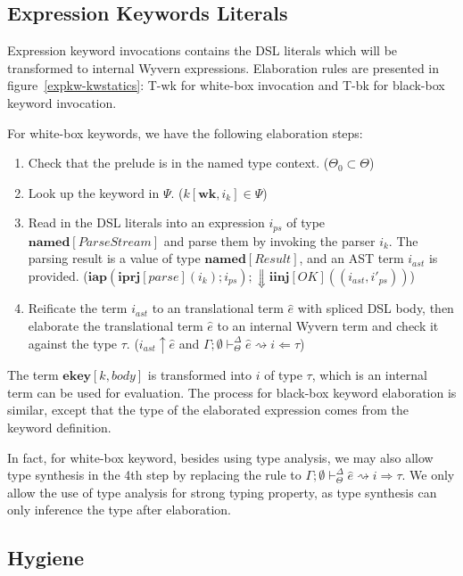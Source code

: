 \documentclass{sig-alternate}
\newcommand{\myvdash}{\vdash_{\Theta}^{\Delta}}
\begin{document}


\subsection{Expression Keywords Literals}
Expression keyword invocations contains the DSL literals which will be transformed to internal Wyvern expressions. Elaboration rules are presented in figure~\ref{expkw-kwstatics}: T-wk for white-box invocation and T-bk for black-box keyword invocation.

For white-box keywords, we have the following elaboration steps:
\begin{enumerate}\setlength{\itemsep}{0pt}
\item Check that the prelude is in the named type context. ($\Theta_0\subset\Theta$)
\item Look up the keyword in $\Psi$. ($k[\mathbf{wk},i_k]\in\Psi$)
\item Read in the DSL literals into an expression $i_{ps}$ of type $\mathbf{named}[ParseStream]$ and parse them by invoking the parser $i_k$. The parsing result is a value of type $\mathbf{named}[Result]$, and an AST term $i_{ast}$ is provided. ($\mathbf{iap}(\mathbf{iprj}[parse](i_k); i_{ps});\Downarrow \mathbf{iinj}[OK]((i_{ast}, i'_{ps}))$)
\item Reificate the term $i_{ast}$ to an translational term $\hat{e}$ with spliced DSL body, then elaborate the translational term $\hat{e}$ to an internal Wyvern term and check it against the type $\tau$. ($i_{ast}\uparrow \hat{e}$ and $\Gamma;\emptyset\myvdash \hat{e} \rightsquigarrow i \Leftarrow \tau$)
\end{enumerate}
The term $\mathbf{ekey}[k,body]$ is transformed into $i$ of type $\tau$, which is an internal term can be used for evaluation. The process for black-box keyword elaboration is similar, except that the type of the elaborated expression comes from the keyword definition. 

In fact, for white-box keyword, besides using type analysis, we may also allow type synthesis in the 4th step by replacing the rule to  $\Gamma;\emptyset\myvdash \hat{e} \rightsquigarrow i \Rightarrow \tau$. We only allow the use of type analysis for strong typing property, as type synthesis can only inference the type after elaboration.


\subsection{Hygiene}
\end{document}
